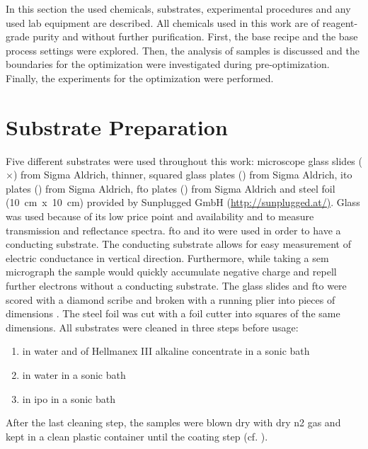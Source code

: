 In this section the used chemicals, substrates, experimental procedures and any used lab equipment are described. 
All chemicals used in this work are of reagent-grade purity and without further purification. 
First, the base recipe and the base process settings were explored. 
Then, the analysis of samples is discussed and the boundaries for the optimization were investigated during pre-optimization.
Finally, the experiments for the optimization were performed.

\section{Substrate Preparation}
Five different substrates were used throughout this work: 
microscope glass slides 
\linebreak[4] 
($\times$) from Sigma Aldrich, thinner, 
squared glass plates (\x{}) from Sigma Aldrich, 
\gls{ito} plates (\x{}) from Sigma Aldrich, 
\gls{fto} plates (\x{}) from Sigma Aldrich and steel foil (10~cm~x~10~cm) provided by Sunplugged GmbH (\url{http://sunplugged.at/)}.
%
Glass was used because of its low price point and availability and to measure transmission and reflectance spectra. 
\gls{fto} and \gls{ito} were used in order to have a conducting substrate. 
The conducting substrate allows for easy measurement of electric conductance in vertical direction.
Furthermore, while taking a \gls{sem} micrograph the sample would quickly accumulate negative charge and repell further electrons without a conducting substrate.
The glass slides and \gls{fto} were scored with a diamond scribe and broken with a running plier into pieces of dimensions \x{}.
The steel foil was cut with a foil cutter into squares of the same dimensions. 
All substrates were cleaned in three steps before usage:
\begin{enumerate}
	\item {} in  \gls{water} and  of Hellmanex III alkaline concentrate in a sonic bath
	\item {} in \gls{water} in a sonic bath
	\item {} in \gls{ipo} in a sonic bath 
\end{enumerate}
After the last cleaning step, the samples were blown dry with dry \gls{n2} gas and kept in a clean plastic container until the coating step (cf. \cite{YAMASHITA2018,Kohli2010}).

